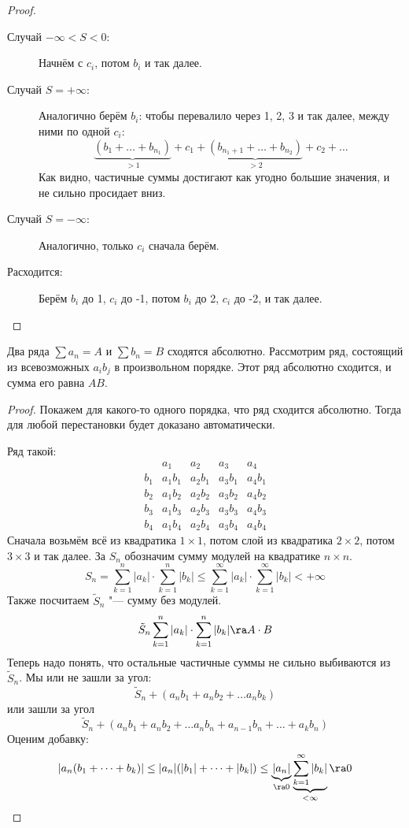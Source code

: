 \begin{proof}
\begin{description}
	\item[Случай $-\infty < S < 0$:]
		Начнём с $c_i$, потом $b_i$ и так далее.

	\item[Случай $S = +\infty$:]
		Аналогично берём $b_i$: чтобы перевалило через 1, 2, 3 и так далее, между ними по одной $c_i$:
		\[ \underbrace{(b_1 + \dots + b_{n_1})}_{> 1} + c_1 + \underbrace{(b_{n_1 + 1} + \dots + b_{n_2})}_{> 2} + c_2 + \dots \]
		Как видно, частичные суммы достигают как угодно большие значения, и не сильно просидает вниз.

	\item[Случай $S = -\infty$:]
		Аналогично, только $c_i$ сначала берём.

	\item[Расходится:]
		Берём $b_i$ до 1, $c_i$ до -1, потом $b_i$ до 2, $c_i$ до -2, и так далее.
	\end{description}
\end{proof}

\begin{theorem}[Коши]
	Два ряда $\sum a_n = A$ и $\sum b_n = B$ сходятся абсолютно.
	Рассмотрим ряд, состоящий из всевозможных $a_ib_j$ в произвольном порядке.
	Этот ряд абсолютно сходится, и сумма его равна $AB$.
\end{theorem}
\begin{proof}
	Покажем для какого-то одного порядка, что ряд сходится абсолютно.
	Тогда для любой перестановки будет доказано автоматически.

	Ряд такой:
	\[\begin{array}{ccccc}
		    & a_1    & a_2    & a_3    & a_4    \\
		b_1 & a_1b_1 & a_2b_1 & a_3b_1 & a_4b_1 \\
		b_2 & a_1b_2 & a_2b_2 & a_3b_2 & a_4b_2 \\
		b_3 & a_1b_3 & a_2b_3 & a_3b_3 & a_4b_3 \\
		b_4 & a_1b_4 & a_2b_4 & a_3b_4 & a_4b_4
	\end{array}\]
	Сначала возьмём всё из квадратика $1 \times 1$, потом слой из квадратика $2 \times 2$, потом $3 \times 3$ и так далее.
	За $S_n$ обозначим сумму модулей на квадратике $n \times n$.
	\[ S_n = \sum_{k=1}^n |a_k| \cdot \sum_{k=1}^n |b_k| \le \sum_{k=1}^\infty |a_k| \cdot \sum_{k=1}^\infty |b_k| < +\infty \]
	Также посчитаем $\tilde S_n$ "--- сумму без модулей.
	\[ \tilde S_n \sum_{k=1}^n |a_k| \cdot \sum_{k=1}^n |b_k| \ra A \cdot B \]
	Теперь надо понять, что остальные частичные суммы не сильно выбиваются из $\tilde S_n$.
	Мы или не зашли за угол:
	\[ \tilde S_n + (a_nb_1 + a_nb_2 + \dots a_nb_k) \]
	или зашли за угол
	\[ \tilde S_n + (a_nb_1 + a_nb_2 + \dots a_nb_n + a_{n-1}b_n + \dots + a_kb_n) \]
	Оценим добавку:
	\[
		|a_n(b_1 + \dots + b_k)| 
		\le |a_n| (|b_1| + \dots + |b_k|)
		\le \underbrace{|a_n|}_{\ra 0} \underbrace{\sum_{k=1}^\infty |b_k|}_{<\infty} \ra 0
	\]
\end{proof}

